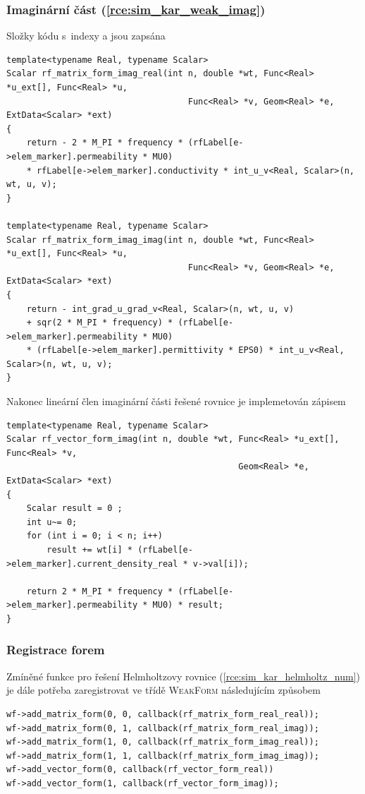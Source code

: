 \subsubsection*{Imaginární část (\ref{rce:sim_kar_weak_imag})}
Složky kódu s~indexy  a  jsou zapsána
\begin{verbatim}
template<typename Real, typename Scalar>
Scalar rf_matrix_form_imag_real(int n, double *wt, Func<Real> *u_ext[], Func<Real> *u,
									Func<Real> *v, Geom<Real> *e, ExtData<Scalar> *ext)
{
    return - 2 * M_PI * frequency * (rfLabel[e->elem_marker].permeability * MU0) 
    * rfLabel[e->elem_marker].conductivity * int_u_v<Real, Scalar>(n, wt, u, v);
}

template<typename Real, typename Scalar>
Scalar rf_matrix_form_imag_imag(int n, double *wt, Func<Real> *u_ext[], Func<Real> *u,
                                    Func<Real> *v, Geom<Real> *e, ExtData<Scalar> *ext)
{
    return - int_grad_u_grad_v<Real, Scalar>(n, wt, u, v) 
    + sqr(2 * M_PI * frequency) * (rfLabel[e->elem_marker].permeability * MU0) 
    * (rfLabel[e->elem_marker].permittivity * EPS0) * int_u_v<Real, Scalar>(n, wt, u, v);
}
\end{verbatim}
Nakonec lineární člen imaginární části řešené rovnice je implemetován zápisem
\begin{verbatim}
template<typename Real, typename Scalar>
Scalar rf_vector_form_imag(int n, double *wt, Func<Real> *u_ext[], Func<Real> *v,
                                              Geom<Real> *e, ExtData<Scalar> *ext)
{
    Scalar result = 0 ;
    int u~= 0;
    for (int i = 0; i < n; i++)
        result += wt[i] * (rfLabel[e->elem_marker].current_density_real * v->val[i]);

    return 2 * M_PI * frequency * (rfLabel[e->elem_marker].permeability * MU0) * result;
}
\end{verbatim}
\subsubsection*{Registrace forem}
Zmíněné funkce pro řešení Helmholtzovy rovnice (\ref{rce:sim_kar_helmholtz_num}) je dále potřeba zaregistrovat ve třídě \textsc{WeakForm} následujícím způsobem
\begin{verbatim}
wf->add_matrix_form(0, 0, callback(rf_matrix_form_real_real));
wf->add_matrix_form(0, 1, callback(rf_matrix_form_real_imag));
wf->add_matrix_form(1, 0, callback(rf_matrix_form_imag_real));
wf->add_matrix_form(1, 1, callback(rf_matrix_form_imag_imag));
wf->add_vector_form(0, callback(rf_vector_form_real))
wf->add_vector_form(1, callback(rf_vector_form_imag));
\end{verbatim}


